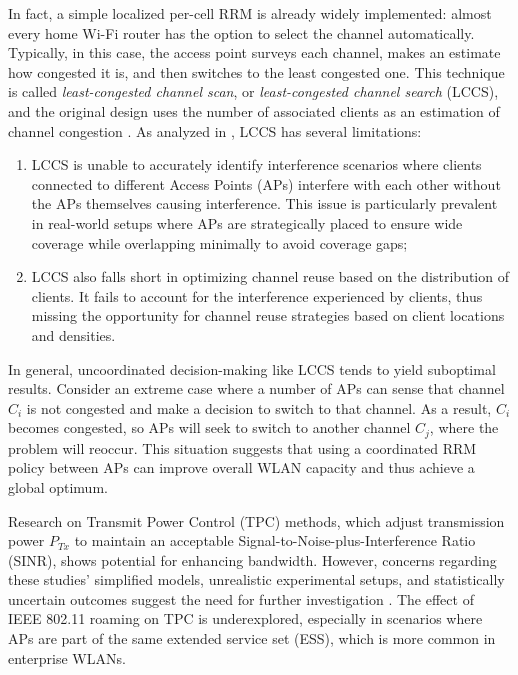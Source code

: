 In fact, a simple localized per-cell RRM is already widely implemented: almost every home Wi-Fi router has the option to select the channel automatically. Typically, in this case, the access point surveys each channel, makes an estimate how congested it is, and then switches to the least congested one. This technique is called \textit{least-congested channel scan}, or \textit{least-congested channel search} (LCCS), and the original design uses the number of associated clients as an estimation of channel congestion \cite{achantaMethodApparatusLeast2006}.
As analyzed in \cite{aruneshmishraWeightedColoringBased2005}, LCCS has several limitations:
\begin{enumerate}
    \item LCCS is unable to accurately identify interference scenarios where clients connected to different Access Points (APs) interfere with each other without the APs themselves causing interference. This issue is particularly prevalent in real-world setups where APs are strategically placed to ensure wide coverage while overlapping minimally to avoid coverage gaps;
    \item LCCS also falls short in optimizing channel reuse based on the distribution of clients. It fails to account for the interference experienced by clients, thus missing the opportunity for channel reuse strategies based on client locations and densities.
\end{enumerate}

In general, uncoordinated decision-making like LCCS tends to yield suboptimal results. Consider an extreme case where a number of APs can sense that channel $C_i$ is not congested and make a decision to switch to that channel. As a result, $C_i$ becomes congested, so APs will seek to switch to another channel $C_j$, where the problem will reoccur. This situation suggests that using a coordinated RRM policy between APs can improve overall WLAN capacity and thus achieve a global optimum.

Research on Transmit Power Control (TPC) methods, which adjust transmission power $P_{Tx}$ to maintain an acceptable Signal-to-Noise-plus-Interference Ratio (SINR), shows potential for enhancing bandwidth. However, concerns regarding these studies' simplified models, unrealistic experimental setups, and statistically uncertain outcomes suggest the need for further investigation \cite{michalskiSimplePerformanceboostingAlgorithm2016,kazminIspolzovanieNeyronnyhSetey2021}. The effect of IEEE 802.11 roaming on TPC is underexplored, especially in scenarios where APs are part of the same extended service set (ESS), which is more common in enterprise WLANs.

